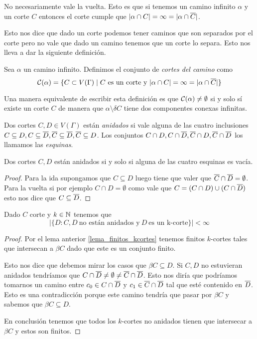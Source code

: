 \documentclass[tesis.tex]{subfiles}
\begin{document}
No necesariamente vale la vuelta.
Esto es que si tenemos un camino infinito $\alpha$ y un corte $C$ entonces el corte cumple que $|\alpha \cap C| = \infty = |\alpha \cap \overline C|$.

Esto nos dice que dado un corte podemos tener caminos que son separados por el corte pero no vale que dado un camino tenemos que un corte lo separa.
Esto nos lleva a dar la siguiente definición.

\begin{deff}
	Sea $\alpha$ un camino infinito.
	Definimos el conjunto de \emph{cortes del camino} como 
	\[
		{\cal C}(\alpha) = \{ C \subset V(\Gamma) \mid  C \ \text{es un corte y} \ |\alpha \cap C| = \infty = |\alpha \cap \overline C| \}
	\] 
\end{deff}

Una manera equivalente de escribir esta definición es que ${\cal C}(\alpha) \neq \emptyset$ si y solo sí existe un corte $C$ de manera que $\alpha \setminus \delta C$ tiene dos componentes conexas infinitas.



\begin{deff}
	Dos cortes $C,D \in V(\Gamma)$ están \emph{anidados} si vale alguna de las cuatro inclusiones $C \subseteq D, C \subseteq \overline D, \overline C \subseteq \overline D, \overline C \subseteq D$.
	Los conjuntos $C \cap D, C \cap \overline D, \overline C \cap D, \overline C \cap \overline D$ los llamamos las \emph{esquinas}.
\end{deff}

\begin{lema}
	Dos cortes $C,D$ están anidados si y solo si alguna de las cuatro esquinas es vacía.
\end{lema}
\begin{proof}
	Para la ida supongamos que $C \subseteq D$ luego tiene que valer que $\overline C \cap \overline D = \emptyset$.
	Para la vuelta si por ejemplo $C \cap D = \emptyset$ como vale que $C = (C \cap D) \cup (C \cap \overline D)$ esto nos dice que $C \subseteq \overline D$.
	
\end{proof}

\begin{lema}
	Dado $C$ corte y $k \in \mathbb{N}$ tenemos que 
	\[
	| \{  D : C, D \ \text{no están anidados y} \ D \ \text{es un k-corte}   \} | < \infty
	\]
\end{lema}
\begin{proof}
	Por el lema anterior \ref{lema_finitos_kcortes} tenemos finitos $k$-cortes tales que intersecan a $\beta C$ dado que este es un conjunto finito.
	
	Esto nos dice que debemos mirar los casos que $\beta C \subseteq D$.
	Si $C,D$ no estuvieran anidados tendríamos que $C \cap \overline D \neq \emptyset \neq \overline C \cap \overline D$.
	Esto nos diría que podríamos tomarnos un camino entre $c_0 \in C \cap \overline D$ y $c_1 \in \overline C \cap \overline D$ tal que esté contenido en $\overline D$.
	Esto es una contradicción porque este camino tendría que pasar por $\beta C$ y sabemos que $\beta C \subseteq D$.
	
	En conclusión tenemos que todos los $k$-cortes no anidados tienen que intersecar a $\beta C$ y estos son finitos.
				
\end{proof}
\end{document}
